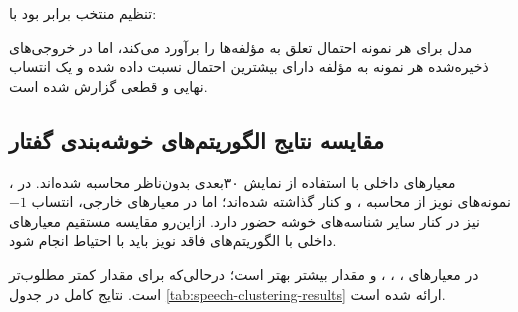 \documentclass[12pt,a4paper,oneside]{report}
\begin{document}
تنظیم منتخب برابر بود با:

\begin{center}
\end{center}

مدل برای هر نمونه احتمال تعلق به مؤلفه‌ها را برآورد می‌کند، اما در
خروجی‌های ذخیره‌شده هر نمونه به مؤلفه دارای بیشترین احتمال نسبت داده شده و
یک انتساب نهایی و قطعی گزارش شده است.


\subsection{مقایسه نتایج الگوریتم‌های خوشه‌بندی گفتار}

معیارهای داخلی با استفاده از نمایش ۳۰بعدی بدون‌ناظر محاسبه شده‌اند.
در ، نمونه‌های نویز از محاسبه ،
 و  کنار گذاشته شده‌اند؛ اما
در معیارهای خارجی، انتساب $-1$ نیز در کنار سایر شناسه‌های خوشه حضور دارد.
ازاین‌رو مقایسه مستقیم معیارهای داخلی  با الگوریتم‌های فاقد
نویز باید با احتیاط انجام شود.

در معیارهای ، ، ،
 و  مقدار بیشتر بهتر است؛ درحالی‌که برای
 مقدار کمتر مطلوب‌تر است. نتایج کامل در جدول
\ref{tab:speech-clustering-results}
ارائه شده است.
\end{document}
